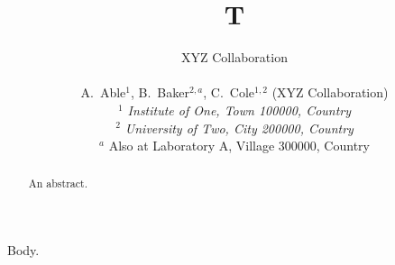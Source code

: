 \documentclass[aps,prd]{revtex4-1}
\begin{document}
\title{T}
\author{\center XYZ Collaboration\\~\\
A.~Able$^{1}$, B.~Baker$^{2,a}$, C.~Cole$^{1,2}$
\vspace{0.2cm}
(XYZ Collaboration)\\
\vspace{0.2cm} {\it
$^{1}$ Institute of One, Town 100000, Country\\
$^{2}$ University of Two, City 200000, Country\\
}
$^{a}$ Also at Laboratory A, Village 300000, Country\\
}
\begin{abstract}
An abstract.
\end{abstract}
\maketitle
Body.
\end{document}
